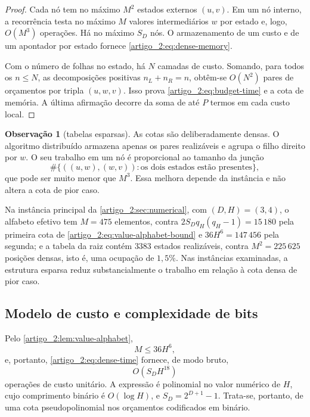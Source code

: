 \documentclass[12pt,a4paper]{article}
\theoremstyle{preciso}
\theoremstyle{definition}
\theoremstyle{preciso}
\theoremstyle{preciso}
\theoremstyle{preciso}
\theoremstyle{preciso}
\theoremstyle{definition}
\theoremstyle{preciso}
\theoremstyle{definition}
\newtheorem{remark}[teorema]{Observação}
\theoremstyle{preciso}
\theoremstyle{preciso}
\theoremstyle{definition}
\begin{document}
\begin{proof}
Cada nó tem no máximo $M^2$ estados externos $(u,v)$. Em um nó interno, a
recorrência testa no máximo $M$ valores intermediários $w$ por estado e, logo,
$O(M^3)$ operações. Há no máximo $S_D$ nós. O armazenamento de um custo e de um apontador
por estado fornece \eqref{artigo_2:eq:dense-memory}.

Com o número de folhas no estado, há $N$ camadas de custo. Somando, para todos
os $n\le N$, as decomposições positivas $n_L+n_R=n$, obtêm-se $O(N^2)$ pares de
orçamentos por tripla $(u,w,v)$. Isso prova \eqref{artigo_2:eq:budget-time} e a cota de
memória. A última afirmação decorre da soma de até $P$ termos em cada custo local.
\end{proof}

\begin{remark}[tabelas esparsas]\label{map:artigo_2:9.2}
\label{artigo_2:rem:sparse}
As cotas são deliberadamente densas. O algoritmo distribuído armazena apenas
os pares realizáveis e agrupa o filho direito por $w$. O seu trabalho em um nó é
proporcional ao tamanho da junção
\[
 \#\{((u,w),(w,v)):\text{os dois estados estão presentes}\},
\]
que pode ser muito menor que $M^3$. Essa melhora depende da instância e não
altera a cota de pior caso.

Na instância principal da \cref{artigo_2:sec:numerical}, com
$(D,H)=(3,4)$, o alfabeto efetivo tem $M=475$ elementos, contra
$2S_Dq_H(q_H-1)=15\,180$ pela primeira cota de
\eqref{artigo_2:eq:value-alphabet-bound} e $36H^6=147\,456$ pela segunda; e a tabela da
raiz contém $3383$ estados realizáveis, contra $M^2=225\,625$ posições
densas, isto é, uma ocupação de $1{,}5\%$. Nas instâncias examinadas, a
estrutura esparsa reduz substancialmente o trabalho em relação à cota densa de
pior caso.
\end{remark}

\subsection{Modelo de custo e complexidade de bits}

Pelo \cref{artigo_2:lem:value-alphabet},
\[
 M\le36H^6,
\]
e, portanto, \eqref{artigo_2:eq:dense-time} fornece, de modo bruto,
\begin{equation}
 O(S_DH^{18})
 \label{artigo_2:eq:height-worst}
\end{equation}
operações de custo unitário. A expressão é polinomial no valor numérico de
$H$, cujo comprimento binário é $O(\log H)$, e
$S_D=2^{D+1}-1$. Trata-se, portanto, de uma cota pseudopolinomial nos
orçamentos codificados em binário.
\end{document}

